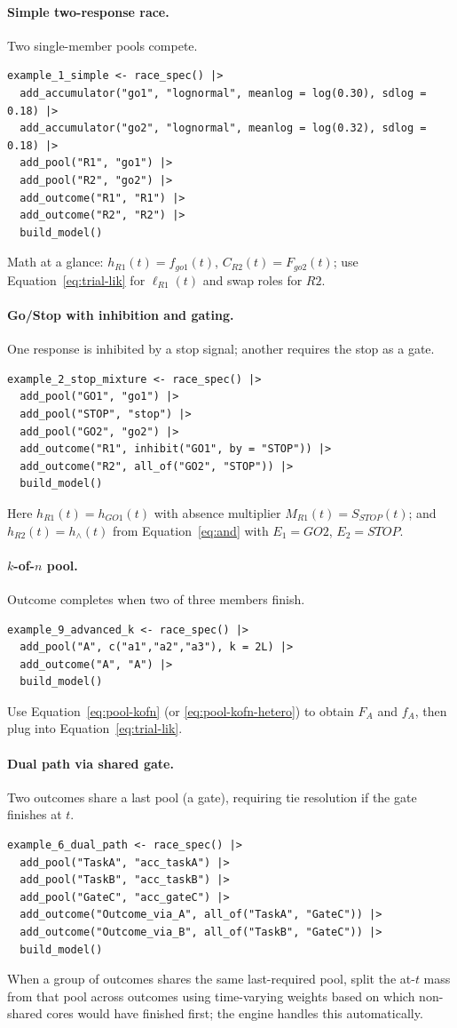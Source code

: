\documentclass[11pt]{article}
\begin{document}
\paragraph{Simple two-response race.} Two single-member pools compete.
\begin{verbatim}
example_1_simple <- race_spec() |>
  add_accumulator("go1", "lognormal", meanlog = log(0.30), sdlog = 0.18) |>
  add_accumulator("go2", "lognormal", meanlog = log(0.32), sdlog = 0.18) |>
  add_pool("R1", "go1") |>
  add_pool("R2", "go2") |>
  add_outcome("R1", "R1") |>
  add_outcome("R2", "R2") |>
  build_model()
\end{verbatim}
Math at a glance: $h_{R1}(t)=f_{go1}(t)$, $C_{R2}(t)=F_{go2}(t)$; use Equation~\eqref{eq:trial-lik} for $\ell_{R1}(t)$ and swap roles for $R2$.
\paragraph{Go/Stop with inhibition and gating.} One response is inhibited by a stop signal; another requires the stop as a gate.
\begin{verbatim}
example_2_stop_mixture <- race_spec() |>
  add_pool("GO1", "go1") |>
  add_pool("STOP", "stop") |>
  add_pool("GO2", "go2") |>
  add_outcome("R1", inhibit("GO1", by = "STOP")) |>
  add_outcome("R2", all_of("GO2", "STOP")) |>
  build_model()
\end{verbatim}
Here $h_{R1}(t)=h_{GO1}(t)$ with absence multiplier $M_{R1}(t)=S_{STOP}(t)$; and $h_{R2}(t)=h_{\land}(t)$ from Equation~\eqref{eq:and} with $E_1=GO2$, $E_2=STOP$.
\paragraph{$k$-of-$n$ pool.} Outcome completes when two of three members finish.
\begin{verbatim}
example_9_advanced_k <- race_spec() |>
  add_pool("A", c("a1","a2","a3"), k = 2L) |>
  add_outcome("A", "A") |>
  build_model()
\end{verbatim}
Use Equation~\eqref{eq:pool-kofn} (or \eqref{eq:pool-kofn-hetero}) to obtain $F_A$ and $f_A$, then plug into Equation~\eqref{eq:trial-lik}.
\paragraph{Dual path via shared gate.} Two outcomes share a last pool (a gate), requiring tie resolution if the gate finishes at $t$.
\begin{verbatim}
example_6_dual_path <- race_spec() |>
  add_pool("TaskA", "acc_taskA") |>
  add_pool("TaskB", "acc_taskB") |>
  add_pool("GateC", "acc_gateC") |>
  add_outcome("Outcome_via_A", all_of("TaskA", "GateC")) |>
  add_outcome("Outcome_via_B", all_of("TaskB", "GateC")) |>
  build_model()
\end{verbatim}
When a group of outcomes shares the same last-required pool, split the at-$t$ mass from that pool across outcomes using time-varying weights based on which non-shared cores would have finished first; the engine handles this automatically.
\end{document}

